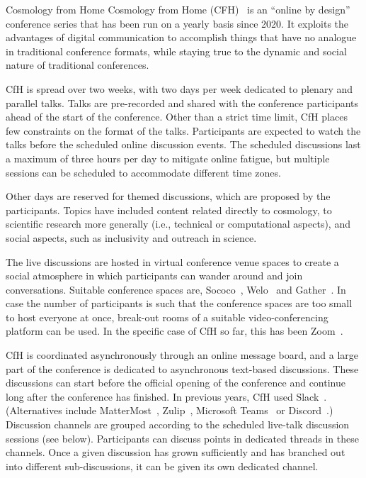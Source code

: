 \documentclass[../SustainableHEP.tex]{subfiles}
\begin{document}

\begin{casestudy}{Cosmology from Home}%
Cosmology from Home (CFH)~\cite{CfHwebsite} is an ``online by design'' conference series that has been run on a yearly basis since 2020. It exploits the advantages of digital communication to accomplish things that have no analogue in traditional conference formats, while staying true to the dynamic and social nature of traditional conferences.

CfH is spread over two weeks, with two days per week dedicated to plenary and parallel talks. Talks are pre-recorded and shared with the conference participants ahead of the start of the conference. Other than a strict time limit, CfH places few constraints on the format of the talks. Participants are expected to watch the talks before the scheduled online discussion events. The scheduled discussions last a maximum of three hours per day to mitigate online fatigue, but multiple sessions can be scheduled to accommodate different time zones.

Other days are reserved for themed discussions, which are proposed by the participants.  Topics have included content related directly to cosmology, to scientific research more generally (i.e., technical or computational aspects), and social aspects, such as inclusivity and outreach in science.

The live discussions are hosted in virtual conference venue spaces to create a social atmosphere in which participants can wander around and join conversations. Suitable conference spaces are, \eg Sococo~\cite{Sococo}, Welo~\cite{Welo} and Gather~\cite{Gather}. In case the number of participants is such that the conference spaces are too small to host everyone at once, break-out rooms of a suitable video-conferencing platform can be used. In the specific case of CfH so far, this has been Zoom~\cite{Zoom}.

CfH is coordinated asynchronously through an online message board, and a large part of the conference is dedicated to asynchronous text-based discussions. These discussions can start before the official opening of the conference and continue long after the conference has finished. In previous years, CfH used Slack~\cite{Slack}. (Alternatives include MatterMost~\cite{MatterMost}, Zulip~\cite{Zulip}, Microsoft Teams~\cite{Teams} or Discord~\cite{Discord}.) Discussion channels are grouped according to the scheduled live-talk discussion sessions (see below). Participants can discuss points in dedicated threads in these channels. Once a given discussion has grown sufficiently and has branched out into different sub-discussions, it can be given its own dedicated channel.


\end{casestudy}
\end{document}
